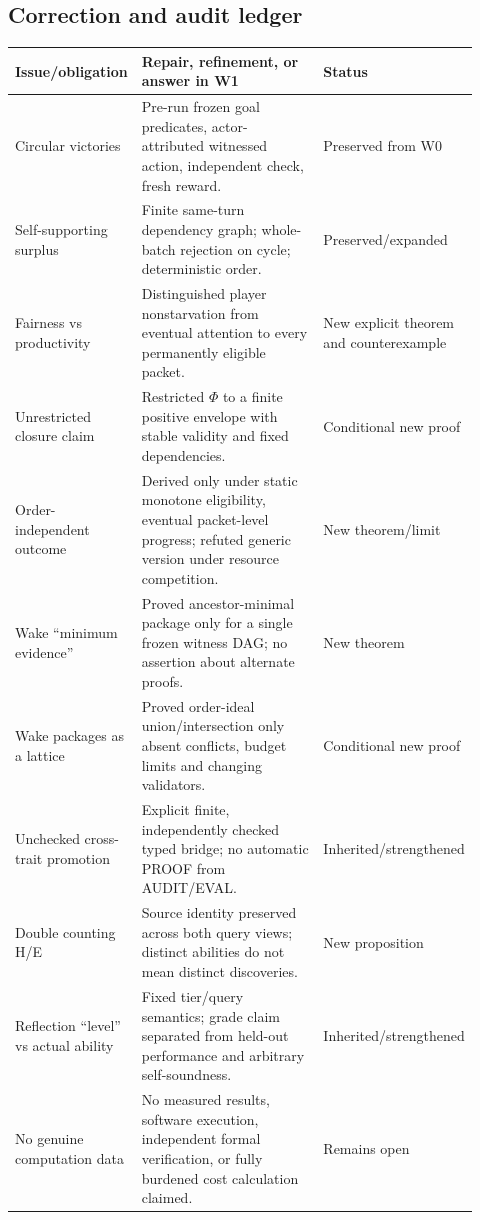 \documentclass[11pt,letterpaper]{article}
\begin{document}
\subsection{Correction and audit ledger}
\begingroup\footnotesize\setlength{\tabcolsep}{4pt}
\begin{longtable}{>{\raggedright\arraybackslash}p{0.24\linewidth}>{\raggedright\arraybackslash}p{0.48\linewidth}>{\raggedright\arraybackslash}p{0.20\linewidth}}
\toprule
Issue/obligation & Repair, refinement, or answer in W1 & Status\\\midrule\endhead
Circular victories & Pre-run frozen goal predicates, actor-attributed witnessed action, independent check, fresh reward. & Preserved from W0\\
Self-supporting surplus & Finite same-turn dependency graph; whole-batch rejection on cycle; deterministic order. & Preserved/expanded\\
Fairness vs productivity & Distinguished player nonstarvation from eventual attention to every permanently eligible packet. & New explicit theorem and counterexample\\
Unrestricted closure claim & Restricted $\Phi$ to a finite positive envelope with stable validity and fixed dependencies. & Conditional new proof\\
Order-independent outcome & Derived only under static monotone eligibility, eventual packet-level progress; refuted generic version under resource competition. & New theorem/limit\\
Wake ``minimum evidence'' & Proved ancestor-minimal package only for a single frozen witness DAG; no assertion about alternate proofs. & New theorem\\
Wake packages as a lattice & Proved order-ideal union/intersection only absent conflicts, budget limits and changing validators. & Conditional new proof\\
Unchecked cross-trait promotion & Explicit finite, independently checked typed bridge; no automatic PROOF from AUDIT/EVAL. & Inherited/strengthened\\
Double counting H/E & Source identity preserved across both query views; distinct abilities do not mean distinct discoveries. & New proposition\\
Reflection ``level'' vs actual ability & Fixed tier/query semantics; grade claim separated from held-out performance and arbitrary self-soundness. & Inherited/strengthened\\
No genuine computation data & No measured results, software execution, independent formal verification, or fully burdened cost calculation claimed. & Remains open\\

\end{longtable}
\end{document}

